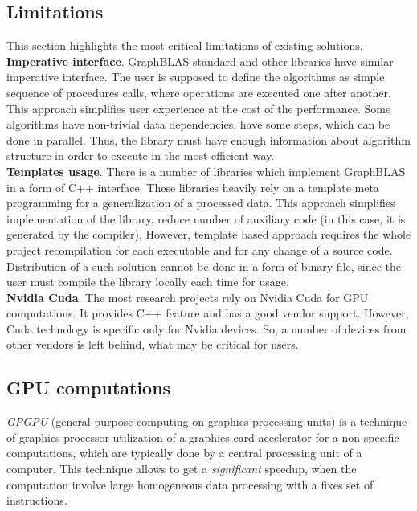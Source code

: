 \subsection{Limitations}

This section highlights the most critical limitations of existing solutions.\\

\textbf{Imperative interface}. GraphBLAS standard and other libraries have similar imperative interface. The user is supposed to define the algorithms as simple sequence of procedures calls, where operations are executed one after another. This approach simplifies user experience at the cost of the performance. Some algorithms have non-trivial data dependencies, have some steps, which can be done in parallel. Thus, the library must have enough information about algorithm structure in order to execute in the most efficient way.\\

\textbf{Templates usage}. There is a number of libraries which implement GraphBLAS in a form of C++ interface. These libraries heavily rely on a template meta programming for a generalization of a processed data. This approach simplifies implementation of the library, reduce number of auxiliary code (in this case, it is generated by the compiler). However, template based approach requires the whole project recompilation for each executable and for any change of a source code. Distribution of a such solution cannot be done in a form of binary file, since the user must compile the library locally each time for usage.\\

\textbf{Nvidia Cuda}. The most research projects rely on Nvidia Cuda for GPU computations. It provides C++ feature and has a good vendor support. However, Cuda technology is specific only for Nvidia devices. So, a number of devices from other vendors is left behind, what may be critical for users.

\subsection{GPU computations}

\textit{GPGPU} (general-purpose computing on graphics processing units) is a technique of graphics processor utilization of a graphics card accelerator for a non-specific computations, which are typically done by a central processing unit of a computer. This technique allows to get a \textit{significant} speedup, when the computation involve large homogeneous data processing with a fixes set of instructions.

